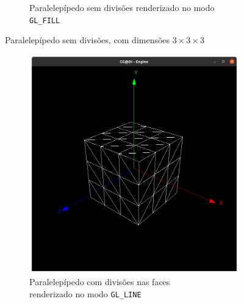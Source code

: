 \documentclass[a4paper, 11pt]{article}
\begin{document}
\begin{figure}[H]
\begin{subfigure}{.5\textwidth}
    \caption{Paralelepípedo sem divisões renderizado no modo \texttt{GL\_FILL}}
\end{subfigure}
\caption{Paralelepípedo sem divisões, com dimensões $3\times3\times3$}
\end{figure}

\begin{figure}[H]
\centering
\begin{subfigure}{.5\textwidth}
    \centering
    \includegraphics[width=\textwidth]{img/box_div_linhas.png}
    \caption{Paralelepípedo com divisões nas faces \\renderizado no modo \texttt{GL\_LINE}}
\end{subfigure}%
\begin{subfigure}{.5\textwidth}
    \centering

\end{subfigure}
\end{figure}
\end{document}
